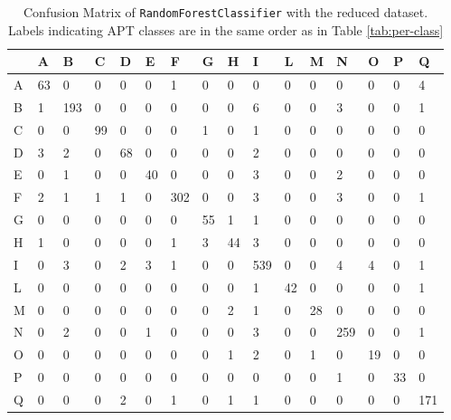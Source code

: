 \begin{table}[]
	\caption{Confusion Matrix of \texttt{RandomForestClassifier} with the reduced dataset. Labels indicating APT classes are in the same order as in Table \ref{tab:per-class}  }
	\label{tab:conf-matr}
	\begin{tabular}{l|lllllllllllllll}
		
		& A & B & C & D & E & F & G & H & I & L & M & N & O & P & Q \\
		\hline
		A & 63 & 0 & 0 & 0 & 0 & 1 & 0 & 0 & 0 & 0 & 0 & 0 & 0 & 0 & 4 \\
		B & 1 & 193 & 0 & 0 & 0 & 0 & 0 & 0 & 6 & 0 & 0 & 3 & 0 & 0 & 1 \\
		C & 0 & 0 & 99 & 0 & 0 & 0 & 1 & 0 & 1 & 0 & 0 & 0 & 0 & 0 & 0 \\
		D & 3 & 2 & 0 & 68 & 0 & 0 & 0 & 0 & 2 & 0 & 0 & 0 & 0 & 0 & 0 \\
		E & 0 & 1 & 0 & 0 & 40 & 0 & 0 & 0 & 3 & 0 & 0 & 2 & 0 & 0 & 0 \\
		F & 2 & 1 & 1 & 1 & 0 & 302 & 0 & 0 & 3 & 0 & 0 & 3 & 0 & 0 & 1 \\
		G & 0 & 0 & 0 & 0 & 0 & 0 & 55 & 1 & 1 & 0 & 0 & 0 & 0 & 0 & 0 \\
		H & 1 & 0 & 0 & 0 & 0 & 1 & 3 & 44 & 3 & 0 & 0 & 0 & 0 & 0 & 0 \\
		I & 0 & 3 & 0 & 2 & 3 & 1 & 0 & 0 & 539 & 0 & 0 & 4 & 4 & 0 & 1 \\
		L & 0 & 0 & 0 & 0 & 0 & 0 & 0 & 0 & 1 & 42 & 0 & 0 & 0 & 0 & 1 \\
		M & 0 & 0 & 0 & 0 & 0 & 0 & 0 & 2 & 1 & 0 & 28 & 0 & 0 & 0 & 0 \\
		N & 0 & 2 & 0 & 0 & 1 & 0 & 0 & 0 & 3 & 0 & 0 & 259 & 0 & 0 & 1 \\
		O & 0 & 0 & 0 & 0 & 0 & 0 & 0 & 1 & 2 & 0 & 1 & 0 & 19 & 0 & 0 \\
		P & 0 & 0 & 0 & 0 & 0 & 0 & 0 & 0 & 0 & 0 & 0 & 1 & 0 & 33 & 0 \\
		Q & 0 & 0 & 0 & 2 & 0 & 1 & 0 & 1 & 1 & 0 & 0 & 0 & 0 & 0 & 171 
	\end{tabular}
\end{table}
